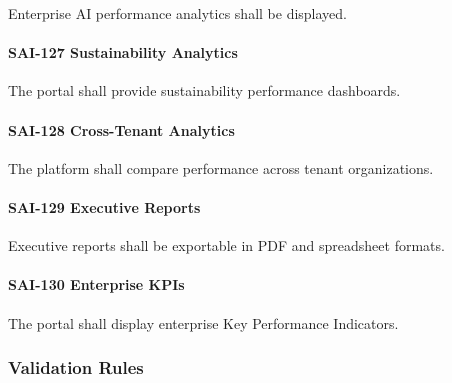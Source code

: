 Enterprise AI performance analytics shall be displayed.

\paragraph{SAI-127 Sustainability Analytics}

The portal shall provide sustainability performance dashboards.

\paragraph{SAI-128 Cross-Tenant Analytics}

The platform shall compare performance across tenant organizations.

\paragraph{SAI-129 Executive Reports}

Executive reports shall be exportable in PDF and spreadsheet formats.

\paragraph{SAI-130 Enterprise KPIs}

The portal shall display enterprise Key Performance Indicators.


\subsubsection*{Validation Rules}

